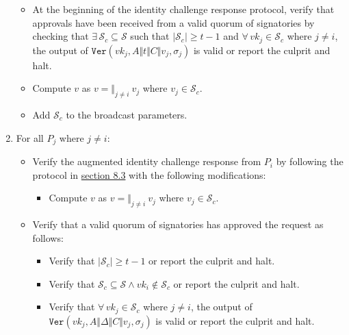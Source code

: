 \documentclass[
]{article}
\providecommand{\tightlist}{%
  \setlength{\itemsep}{0pt}\setlength{\parskip}{0pt}}
\begin{document}
\begin{enumerate}
  \begin{itemize}
  \tightlist
  \item
    At the beginning of the identity challenge response protocol, verify
    that approvals have been received from a valid quorum of signatories
    by checking that \(\exists \, \mathcal{S} _c \subseteq \mathcal{S}\)
    such that \(|\mathcal{S} _c| \geq t - 1\) and
    \(\forall \, vk_j \in \mathcal{S} _c\) where \(j \neq i\), the
    output of
    \(\mathtt{Ver}(vk_j, A \Vert t \Vert C \Vert v_j, \sigma _j)\) is
    valid or report the culprit and halt.
  \item
    Compute \(v\) as \(v = \Vert _{j \neq i} \: v_j\) where
    \(v_j \in \mathcal{S} _c\).
  \item
    Add \(\mathcal{S} _c\) to the broadcast parameters.
  \end{itemize}
\item
  For all \(P_j\) where \(j \neq i\):

  \begin{itemize}
  \tightlist
  \item
    Verify the augmented identity challenge response from \(P_i\) by
    following the protocol in
    \protect\hyperlink{identity-challenge-verification}{section 8.3}
    with the following modifications:

    \begin{itemize}
    \tightlist
    \item
      Compute \(v\) as \(v = \Vert _{j \neq i} \: v_j\) where
      \(v_j \in \mathcal{S} _c\).
    \end{itemize}
  \item
    Verify that a valid quorum of signatories has approved the request
    as follows:

    \begin{itemize}
    \tightlist
    \item
      Verify that \(|\mathcal{S} _c| \geq t - 1\) or report the culprit
      and halt.
    \item
      Verify that
      \(\mathcal{S} _c \subseteq \mathcal{S} \land vk_i \notin \mathcal{S} _c\)
      or report the culprit and halt.
    \item
      Verify that \(\forall \, vk_j \in \mathcal{S} _c\) where
      \(j \neq i\), the output of
      \(\mathtt{Ver}(vk_j, A \Vert \Delta \Vert C \Vert v_j, \sigma _j)\)
      is valid or report the culprit and halt.
    \end{itemize}
  \end{itemize}
\end{enumerate}
\end{document}
